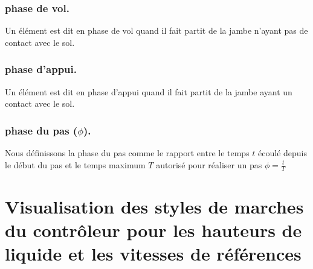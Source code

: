 \documentclass[runningheads,a4paper]{llncs}
\begin{document}
\subsubsection{phase de vol.} Un élément est dit en phase de vol quand il fait partit de la jambe n'ayant pas de contact avec le sol.

\subsubsection{phase d'appui.} Un élément est dit en phase d'appui quand il fait partit de la jambe ayant un contact avec le sol.

\subsubsection{phase du pas ($\phi$).} Nous définissons la phase du pas comme le rapport entre le temps $t$ écoulé depuis le début du pas et le temps maximum $T$ autorisé pour réaliser un pas $\phi=\frac{t}{T}$


\newpage
\section{Visualisation des styles de marches du contrôleur pour les hauteurs de liquide et les vitesses de références}
\label{sec:complex_controler_reference}
\end{document}
